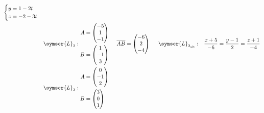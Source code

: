 \documentclass{article}
\def\fancyL{\symscr{L}}
\begin{document}
\begin{enumerate}
\begin{enumerate}[label=\listAlph]
\[\begin{aligned}
\begin{cases}
                        y = 1 -2t \\
                        z = -2 -3t 
                    \end{cases}
                    \\
                    &\fancyL_2:
                    \begin{aligned}
                        A &= \begin{pmatrix}
                            -5 \\ 1 \\ -1
                        \end{pmatrix} \\
                        B &= \begin{pmatrix}
                            1 \\ -1 \\ 3
                        \end{pmatrix}
                    \end{aligned}
                    \hspace{0.5cm}
                    \overline{AB} = 
                    \begin{pmatrix}
                        -6 \\ 2 \\ -4
                    \end{pmatrix}
                    \hspace{0.5cm}
                    \fancyL_{2_{\text{alt}}}:&
                        \frac{x + 5}{-6} 
                        =
                        \frac{y - 1}{2}
                        =
                        \frac{z + 1}{-4}
                    \\
                    &\fancyL_3:
                    \begin{aligned}
                        A &= \begin{pmatrix}
                            0 \\ -1 \\ 2
                        \end{pmatrix} \\
                        B &= \begin{pmatrix}
                            3 \\ 0 \\ 1
                        \end{pmatrix}
                    \end{aligned}
                    \hspace{0.5cm}

\end{aligned}\]
\end{enumerate}
\end{enumerate}
\end{document}
